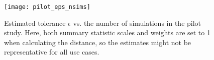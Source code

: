
\begin{figure}[H]
    \centering
    \texttt{[image: pilot\_eps\_nsims]}
    \caption{Estimated tolerance $\epsilon$ vs. the number of simulations in the pilot study. Here, both summary statistic scales and weights are set to 1 when calculating the distance, so the estimates might not be representative for all use cases.}
\end{figure} 








